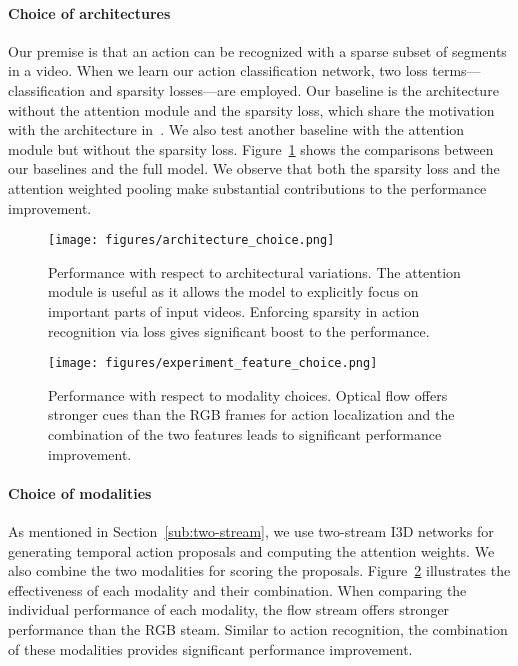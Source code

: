 \documentclass[10pt,twocolumn,letterpaper]{article}
\begin{document}
\paragraph{Choice of architectures}
Our premise is that an action can be recognized with a sparse subset of segments in a video. When we learn our action classification network, two loss terms---classification and sparsity losses---are employed.
Our baseline is the architecture without the attention module and the sparsity loss, which share the motivation with the architecture in~\cite{zhou16learning}. 
We also test another baseline with the attention module but without the sparsity loss.
Figure~\ref{fig:experiment_architecture_choice} shows the comparisons between our baselines and the full model. 
We observe that both the sparsity loss and the attention weighted pooling make substantial contributions to the performance improvement.
\begin{figure}[t]
\captionsetup{font=small}
\centering
\texttt{[image: figures/architecture\_choice.png]}\\
\vspace{-0.1cm}
    \caption{Performance with respect to architectural variations. The attention module is useful as it allows the model to explicitly focus on important parts of input videos.  Enforcing sparsity in action recognition via  loss gives significant boost to the performance.}
\label{fig:experiment_architecture_choice}
\end{figure}

\begin{figure}[t]
\captionsetup{font=small}
\centering
\texttt{[image: figures/experiment\_feature\_choice.png]}\\
\vspace{-0.1cm}
    \caption{Performance with respect to modality choices. Optical flow offers stronger cues than the RGB frames for action localization and the combination of the two features leads to significant performance improvement.}
\label{fig:experiment_feature_choice}
\end{figure}

\paragraph{Choice of modalities} 
As mentioned in Section~\ref{sub:two-stream}, we use two-stream I3D networks for generating temporal action proposals and computing the attention weights. We also combine the two modalities for scoring the proposals.
Figure~\ref{fig:experiment_feature_choice} illustrates the effectiveness of each modality and their combination. 
When comparing the individual performance of each modality, the flow stream offers stronger performance than the RGB steam.
Similar to action recognition, the combination of these modalities provides significant performance improvement.
\end{document}
